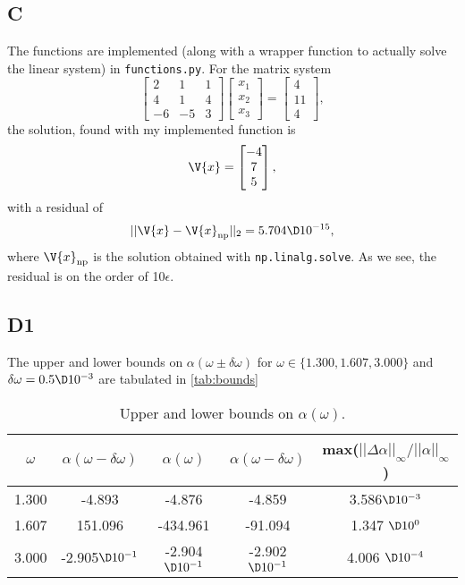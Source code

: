 \documentclass[a4paper,10pt]{article}
\begin{document}
	\subsection*{C}
	The functions are implemented (along with a wrapper function to actually solve the linear system) in \texttt{functions.py}. For the matrix system
	\begin{equation}\label{key}
		\begin{bmatrix}
		2 & 1 & 1 \\ 4 & 1 & 4 \\ -6 & -5 & 3
		\end{bmatrix} \begin{bmatrix}
		x_1 \\ x_2 \\ x_3
		\end{bmatrix} = \begin{bmatrix}
		4 \\ 11 \\ 4
		\end{bmatrix},
	\end{equation}
	the solution, found with my implemented function is
	\begin{equation}\label{key}
		\V{x} = \begin{bmatrix}
		-4 \\ 7 \\ 5
		\end{bmatrix},
	\end{equation}
	with a residual of
	\begin{equation}\label{key}
		||\V{x} - \V{x}_{\text{np}}||_2 = 5.704 \D 10^{-15},
	\end{equation}
	where $ \V{x}_{\text{np}} $ is the solution obtained with \texttt{np.linalg.solve}. As we see, the residual is on the order of 10$ \epsilon $.
	
	\subsection*{D1}
	The upper and lower bounds on $ \alpha(\omega\pm \delta \omega) $ for $ \omega \in \{1.300, 1.607, 3.000\} $ and $ \delta \omega = 0.5\D10^{-3} $ are tabulated in \ref{tab:bounds}
	\begin{table}[H]
		\centering
		\begin{tabular}{c|c|c|c|c}
			$ \omega $ & $ \alpha(\omega-\delta \omega) $ & $ \alpha(\omega) $ & $ \alpha(\omega-\delta \omega) $ & max($ ||\Delta\alpha||_{\infty}/||\alpha||_{\infty} $) \\
			\hline
			1.300 & -4.893 & -4.876 & -4.859 & 3.586$ \D10^{-3} $ \\
			1.607 & 151.096 & -434.961 & -91.094 & 1.347 $ \D10^0 $ \\
			3.000 & -2.905$ \D 10^{-1} $ & -2.904 $ \D 10^{-1} $ & -2.902 $ \D 10^{-1} $ & 4.006 $ \D 10^{-4} $
		\end{tabular}
		\caption{Upper and lower bounds on $ \alpha(\omega) $.}
	\end{table}
	
\end{document}
